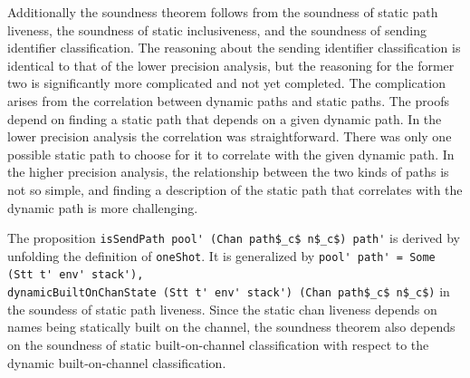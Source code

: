 \documentclass[letterpaper, 11pt]{extarticle}
\begin{document}
Additionally the soundness theorem follows from the soundness of static path liveness,
the soundness of static inclusiveness, and the soundness of sending identifier classification. 
The reasoning about the sending identifier classification is identical to that of the lower precision analysis,
but the reasoning for the former two is significantly more complicated and not yet completed.
The complication arises from the correlation between dynamic paths and static paths.
The proofs depend on finding a static path that depends on a given dynamic path.
In the lower precision analysis the correlation was straightforward.
There was only one possible static path to choose for it
to correlate with the given dynamic path. In the higher precision analysis, the relationship
between the two kinds of paths is not so simple, and finding a description of the static path
that correlates with the dynamic path is more challenging.

The proposition \lstinline[mathescape]{isSendPath pool' (Chan path$_c$ n$_c$) path'} is derived
by unfolding the definition of \lstinline{oneShot}.
It is generalized by \lstinline[mathescape]{pool' path' = Some (Stt t' env' stack'),}\\
\lstinline[mathescape]{dynamicBuiltOnChanState (Stt t' env' stack') (Chan path$_c$ n$_c$)} in the soundess of
static path liveness. Since the static chan liveness depends on names being statically built on the channel,
the soundness theorem also depends on the soundness of static built-on-channel classification with respect
to the dynamic built-on-channel classification.
\end{document}
